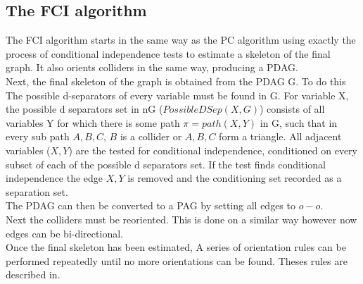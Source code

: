 \documentclass{article}
\begin{document}
\subsection{The FCI algorithm}

The FCI algorithm starts in the same way as the PC algorithm using exactly the process of conditional independence tests to estimate a skeleton of the final graph. It also orients colliders in the same way, producing a PDAG.
\\

Next, the final skeleton of the graph is obtained from the PDAG G. To do this The possible d-separators of every variable must be found in G. For variable X, the possible d separators set in nG ($PossibleDSep(X,G)$) consists of all variables Y for which there is some path $\pi = path(X,Y)$ in G, such that in every sub path $A,B,C$, $B$ is a collider or $A,B,C$ form a triangle. All adjacent variables ($X,Y$) are the tested for conditional independence, conditioned on every subset of each of the possible d separators set. If the test finds conditional independence the edge $X,Y$ is removed and the conditioning set recorded as a separation set. 
\\

The PDAG can then be converted to a PAG by setting all edges to $o-o$.\\

Next the colliders must be reoriented. This is done on a similar way however now edges can be bi-directional.\\

Once the final skeleton has been estimated, A series of orientation rules can be performed repeatedly until no more orientations can be found. Theses rules are described in.\\
\end{document}
